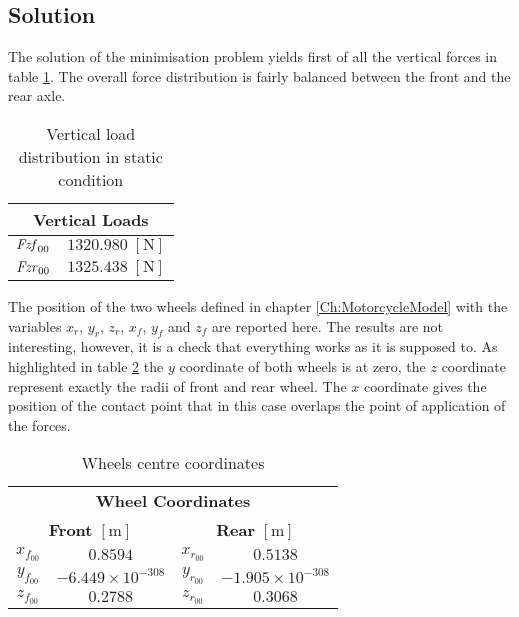 \subsection{Solution}
%
The solution of the minimisation problem yields first of all the vertical forces in table \ref{tab:vertforce}. The overall force distribution is fairly balanced between the front and the rear axle.

%
\begin{table}[h!]
    \centering
    \begin{tabular}{@{}cc@{}}
    \toprule
    \multicolumn{2}{c}{\textbf{Vertical Loads}} \\ \midrule
    ${\it Fzf}_{00}$  & $1320.980 \; [\si{\newton}]$ \\
    ${\it Fzr}_{00}$  & $1325.438 \; [\si{\newton}]$ \\ \bottomrule
    \end{tabular}
    \caption{Vertical load distribution in static condition}
    \label{tab:vertforce}
\end{table}
%

The position of the two wheels defined in chapter \ref{Ch:MotorcycleModel} with the variables $x_r$, $y_r$, $z_r$, $x_f$, $y_f$ and $z_f$ are reported here. The results are not interesting, however, it is a check that everything works as it is supposed to. As highlighted in table \ref{tab:wheelcoordinates} the $y$ coordinate of both wheels is at zero, the $z$ coordinate represent exactly the radii of front and rear wheel. The $x$ coordinate gives the position of the contact point that in this case overlaps the point of application of the forces.

%
\begin{table}[h!]
    \centering
    \begin{tabular}{@{}cccc@{}}
    \toprule
    \multicolumn{4}{c}{\textbf{Wheel Coordinates}}                         \\
    \multicolumn{2}{c}{\textbf{Front} $[\si{\metre}]$} & \multicolumn{2}{c}{\textbf{Rear} $[\si{\metre}]$} \\ \midrule
    $x_{f_{00}}$  &  $ 0.8594                  $ & $x_{r_{00}}$  &  $ 0.5138                  $ \\     
    $y_{f_{00}}$  &  $-{ 6.449\times 10^{-308}}$ & $y_{r_{00}}$  &  $-{ 1.905\times 10^{-308}}$ \\  
    $z_{f_{00}}$  &  $ 0.2788                  $ & $z_{r_{00}}$  &  $ 0.3068                  $ \\ \bottomrule
    \end{tabular}
    \caption{Wheels centre coordinates}
    \label{tab:wheelcoordinates}
\end{table}
%

